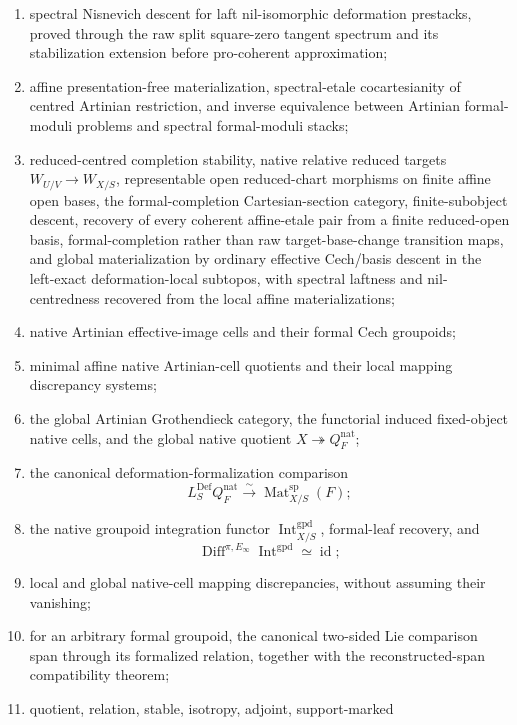 \begin{enumerate}
    \item spectral Nisnevich descent for laft nil-isomorphic deformation
    prestacks, proved through the raw split square-zero tangent spectrum and
    its stabilization extension before pro-coherent approximation;
    \item affine presentation-free materialization, spectral-etale
    cocartesianity of centred Artinian restriction, and inverse equivalence
    between Artinian formal-moduli problems and spectral formal-moduli stacks;
    \item reduced-centred completion stability, native relative reduced targets
    $W_{U/V}\to W_{X/S}$, representable open reduced-chart morphisms on finite
    affine open bases, the formal-completion Cartesian-section category,
    finite-subobject descent, recovery of every coherent affine-etale pair
    from a finite reduced-open basis, formal-completion rather than raw
    target-base-change transition maps, and global materialization by ordinary
    effective Cech/basis descent in the left-exact deformation-local subtopos,
    with spectral laftness and nil-centredness recovered from the local affine
    materializations;
    \item native Artinian effective-image cells and their formal Cech
    groupoids;
    \item minimal affine native Artinian-cell quotients and their local mapping
    discrepancy systems;
    \item the global Artinian Grothendieck category, the functorial induced
    fixed-object native cells, and the global native quotient
    $X\twoheadrightarrow Q_F^{\mathrm{nat}}$;
    \item the canonical deformation-formalization comparison
    \[
        L_S^{\mathrm{Def}}Q_F^{\mathrm{nat}}
        \xrightarrow{\sim}
        \operatorname{Mat}^{\mathrm{sp}}_{X/S}(F);
    \]
    \item the native groupoid integration functor
    $\operatorname{Int}^{\mathrm{gpd}}_{X/S}$, formal-leaf recovery, and
    \[
        \operatorname{Diff}^{\pi,E_\infty}
        \operatorname{Int}^{\mathrm{gpd}}
        \simeq \operatorname{id};
    \]
    \item local and global native-cell mapping discrepancies, without assuming
    their vanishing;
    \item for an arbitrary formal groupoid, the canonical two-sided Lie
    comparison span through its formalized relation, together with the
    reconstructed-span compatibility theorem;
    \item quotient, relation, stable, isotropy, adjoint, support-marked

\end{enumerate}
